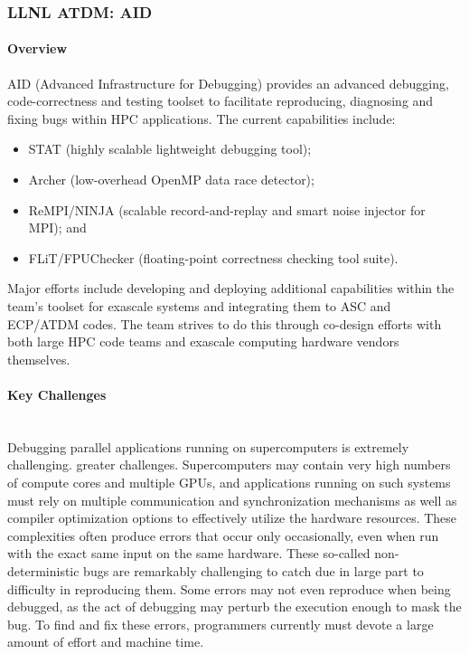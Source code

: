 \subsubsection{ LLNL ATDM: AID}

\paragraph{Overview}

AID (Advanced Infrastructure for Debugging) provides an advanced
debugging, code-correctness and testing toolset to facilitate
reproducing, diagnosing and fixing bugs within HPC applications. The
current capabilities include:

\begin{itemize}
\item STAT (highly scalable lightweight debugging tool);
\item Archer (low-overhead OpenMP data race detector);
\item ReMPI/NINJA (scalable record-and-replay and smart noise injector for MPI); and
\item FLiT/FPUChecker (floating-point correctness checking tool suite).
\end{itemize}

Major efforts include developing and deploying additional capabilities
within the team’s toolset for exascale systems and integrating them to
ASC and ECP/ATDM codes. The team strives to do this through co-design
efforts with both large HPC code teams and exascale computing hardware
vendors themselves.


\paragraph{Key Challenges} \leavevmode \\

Debugging parallel applications running on supercomputers is extremely
challenging.  greater challenges.  Supercomputers may contain very high
numbers of compute cores and multiple GPUs, and applications running on
such systems must rely on multiple communication and synchronization
mechanisms as well as compiler optimization options to effectively
utilize the hardware resources. These complexities often produce errors
that occur only occasionally, even when run with the exact same input on
the same hardware. These so-called non-deterministic bugs are remarkably
challenging to catch due in large part to difficulty in reproducing
them. Some errors may not even reproduce when being debugged, as the act
of debugging may perturb the execution enough to mask the bug.  To find
and fix these errors, programmers currently must devote a large amount of
effort and machine time.

